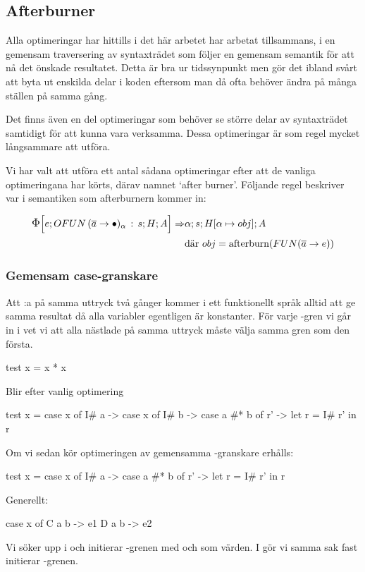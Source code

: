 \documentclass[../Optimise]{subfiles}
\begin{document}
\subsection{Afterburner}

Alla optimeringar har hittills i det här arbetet har arbetat tillsammans, i en gemensam
traversering av syntaxträdet som följer en gemensam semantik för att nå det önskade resultatet. 
Detta är bra ur tidssynpunkt men gör det ibland svårt att byta ut enskilda delar i koden
eftersom man då ofta behöver ändra på många ställen på samma gång.

Det finns även en del optimeringar som behöver se större delar av syntaxträdet
samtidigt för att kunna vara verksamma. Dessa optimeringar är som regel mycket långsammare att utföra.

Vi har valt att utföra ett antal sådana optimeringar efter att de vanliga
optimeringana har körts, därav namnet `after burner'. Följande regel beskriver
var i semantiken som afterburnern kommer in:

\begin{align*}
\CBNIRR{\cOFUN{\many{a}}{\alpha}s}HAe \Rightarrow & \CBNMC{\alpha}{s}{\heap{\alpha}{obj}}A \\
 & \text{där } obj = \text{afterburn} (\FUN{\many{a}}e)
\end{align*}

\subsubsection{Gemensam case-granskare}

Att :a på samma uttryck två gånger kommer i ett funktionellt språk alltid att ge
samma resultat då alla variabler egentligen är konstanter. För varje -gren
vi går in i vet vi att alla nästlade  på samma uttryck måste välja samma
gren som den första.

\begin{codeEx}
test x = x * x
\end{codeEx}

Blir efter vanlig optimering

\begin{codeEx}
test x = case x of
            I# a -> case x of
                I# b -> case a #* b of
                    r' -> let r = I# r'
                            in r
\end{codeEx}

Om vi sedan kör optimeringen av gemensamma -granskare erhålls:
\begin{codeEx}
test x = case x of
            I# a -> case a #* b of
                r' -> let r = I# r'
                    in r
\end{codeEx}

Generellt:
		\begin{codeEx}
case x of
    C a b -> e1
    D a b -> e2
\end{codeEx}

Vi söker upp  i  och initierar 
-grenen med  och  som värden. I  gör vi samma sak fast initierar -grenen.
\end{document}
